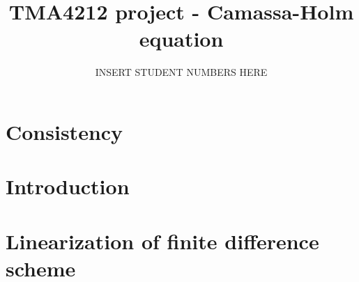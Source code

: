 \documentclass{article}
\title{TMA4212 project - Camassa-Holm equation}
\author{INSERT STUDENT NUMBERS HERE}
\begin{document}
\maketitle

\section*{Consistency}


\newpage

\section*{Introduction}


\newpage

\section*{Linearization of finite difference scheme}

\end{document}
